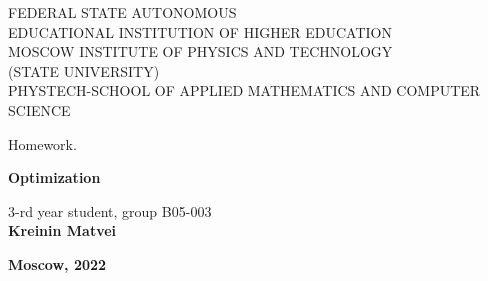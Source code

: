 \begin{center}
	\hfill \break
	\hfill \break	
	FEDERAL STATE AUTONOMOUS \\
    EDUCATIONAL INSTITUTION OF HIGHER EDUCATION \\
    MOSCOW INSTITUTE OF PHYSICS AND TECHNOLOGY \\
    (STATE UNIVERSITY) \\
    PHYSTECH-SCHOOL OF APPLIED MATHEMATICS AND COMPUTER SCIENCE\\

	\hfill \break

	Homework.
	
	\vspace{7em}
	
	\vspace{7em}
	\large{\textbf{Optimization}}\\

\end{center}

\vspace{13em}

\begin{flushright}
	\normalsize{3-rd year student, group B05-003}\\
	\normalsize{\textbf{Kreinin Matvei}}\\
\end{flushright}


\begin{center}
	\normalsize{\textbf{Moscow, 2022}}
\end{center}


\thispagestyle{empty}
\setcounter{page}{0}

